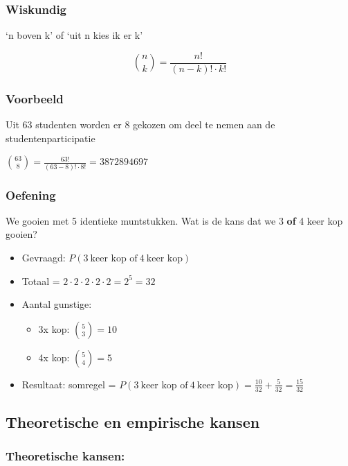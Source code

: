 \documentclass{article}
\begin{document}
\subsubsection{Wiskundig}

`n boven k' of `uit n kies ik er k'

\begin{equation}
    \binom{n}{k} = \frac{n!}{(n-k)! \cdot k!}
\end{equation}

\subsubsection{Voorbeeld}

Uit 63 studenten worden er 8 gekozen om deel te nemen aan de studentenparticipatie

$\binom{63}{8} = \frac{63!}{(63-8)! \cdot 8!} = 3 872 894 697$


\subsubsection{Oefening}

We gooien met 5 identieke muntstukken. Wat is de kans dat we 3 \textbf{of} 4 keer kop gooien?

\begin{itemize}
    \item Gevraagd: $P(3\ \text{keer kop of}\ 4\ \text{keer kop})$
    \item Totaal = $2 \cdot 2 \cdot 2 \cdot 2 \cdot 2 = 2^5 = 32$
    \item Aantal gunstige:
    \begin{itemize}
        \item 3x kop: $\binom{5}{3} = 10$
        \item 4x kop: $\binom{5}{4} = 5$
    \end{itemize}
    \item Resultaat: somregel = $P(3\ \text{keer kop of}\ 4\ \text{keer kop}) = \frac{10}{32} + \frac{5}{32} = \frac{15}{32}$
\end{itemize}

\subsection{Theoretische en empirische kansen}

\subsubsection{Theoretische kansen:}
\end{document}
